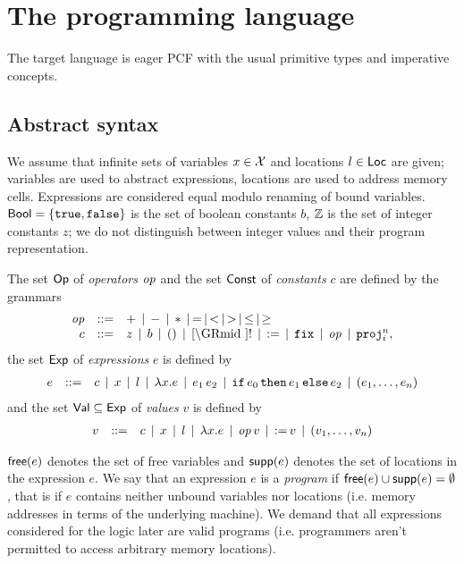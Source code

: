 \documentclass[12pt,a4paper]{report}
\begin{document}

\chapter{The programming language}

The target language is eager PCF with the usual primitive types and imperative concepts.



\section{Abstract syntax}

We assume that infinite sets of variables $x \in \mathcal{X}$ and locations $l \in \mathsf{Loc}$ are given;
variables are used to abstract expressions, locations are used to address memory cells.
Expressions are considered equal modulo renaming of bound variables.
$\mathsf{Bool}=\{\mathtt{true},\mathtt{false}\}$ is the set of boolean constants $b$, $\mathbb Z$ is the set of integer
constants $z$; we do not distinguish between integer values and their program representation.

\begin{definition}[Expressions]
  The set $\mathsf{Op}$ of {\em operators} $\mathit{op}$ and the set $\mathsf{Const}$ of {\em constants} $c$
  are defined by the grammars
  \[\GRbeg
    \op \GRis + \GRmid - \GRmid * \GRmid = \GRmid < \GRmid > \GRmid \le \GRmid \ge \\
    c \GRis z \GRmid b \GRmid \unit \GRmid \cref \GRmid !
             \GRmid \assign \GRmid \fix \GRmid \op \GRmid \proj{n}{i},
  \GRend\]
  the set $\mathsf{Exp}$ of {\em expressions} $e$ is defined by
  \[\begin{array}{rrlll}
    e & ::= & c \,\mid\, x \,\mid\, l \,\mid\, \lambda x.e \,\mid\, e_1\,e_2
      \,\mid\, \mathtt{if}\,e_0\,\mathtt{then}\,e_1\,\mathtt{else}\,e_2 \,\mid\, (e_1,\ldots,e_n)
  \end{array}\]
  and the set $\mathsf{Val} \subseteq \mathsf{Exp}$ of {\em values} $v$ is defined by
  \[\begin{array}{rrlll}
    v & ::= & c \,\mid\, x \,\mid\, l \,\mid\, \lambda x.e \,\mid\, \mathit{op}\,v \,\mid\, \mathtt{:=}\,v
      \,\mid\, (v_1,\ldots,v_n)
  \end{array}\]
\end{definition}

$\mathsf{free}(e)$ denotes the set of free variables and $\mathsf{supp}(e)$ denotes the set of locations in the
expression $e$. We say that an expression $e$ is a {\em program} if $\mathsf{free}(e)\cup\mathsf{supp}(e)=\emptyset$,
that is if $e$ contains neither unbound variables nor
locations (i.e. memory addresses in terms of the underlying machine). We demand that all expressions
considered for the logic later are valid programs (i.e. programmers aren't permitted to access
arbitrary memory locations).
\end{document}
